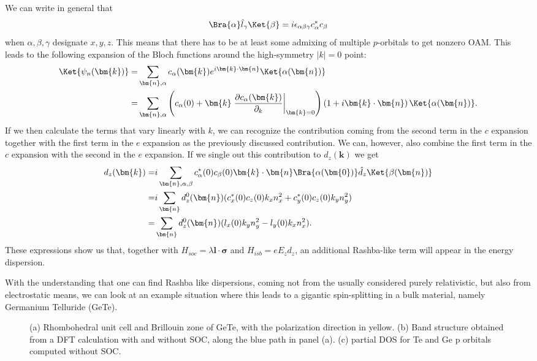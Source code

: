 We can write in general that
\begin{equation}
	\Bra{\alpha} \hat{l}_{\gamma} \Ket{\beta} = i \epsilon_{\alpha \beta \gamma} c^*_\alpha c_\beta
\end{equation}
when $\alpha,\beta,\gamma$ designate $x,y,z$. This means that there has to be at least some admixing of multiple $p$-orbitals to get nonzero OAM. This leads to the following expansion of the Bloch functions around the high-symmetry $|k|=0$ point:
\begin{align}
	\Ket{\psi_n(\bm{k})} =& \sum_{\bm{n},\alpha} c_\alpha(\bm{k}) e^{i \bm{k}\cdot\bm{n}}\Ket{\alpha(\bm{n})}\\
	=& \sum_{\bm{n},\alpha} \left(c_\alpha(0) + \bm{k}\left.\frac{\partial c_\alpha(\bm{k})}{\partial_k}\right\rvert_{\bm{k}=0} \right)\left(1 + i\bm{k}\cdot\bm{n}\right)\Ket{\alpha(\bm{n})} .
\end{align}
If we then calculate the terms that vary linearly with $k$, we can recognize the contribution coming from the second term in the $c$ expansion together with the first term in the $e$ expansion as the previously discussed contribution. We can, however, also combine the first term in the $c$ expansion with the second in the $e$ expansion. If we single out this contribution to $d_z(\bm{k})$ we get
\begin{align}
	\label{eq:d_z_from_OAM}
	d_z(\bm{k}) =&  i\sum_{\bm{n},\alpha,\beta} c_\alpha^*(0)c_\beta(0)\bm{k}\cdot\bm{n}\Bra{\alpha(\bm{0})} \hat{d}_z \Ket{\beta(\bm{n})}\\
	=&i\sum_{\bm{n}} d^0_z(\bm{n}) (c^*_x(0)c_z(0)k_x n_x^2 + c^*_y(0)c_z(0) k_y n_y^2) \\
	=&\sum_{\bm{n}} d^0_z(\bm{n}) (l_x(0)k_y n_y^2-l_y(0) k_x n_x^2).
\end{align}
These expressions show us that, together with $H_{soc} = \lambda \bm{l}\cdot\bm{\sigma}$ and $H_{isb} = e E_z d_z$, an additional Rashba-like term will appear in the energy dispersion.

With the understanding that one can find Rashba like dispersions, coming not from the usually considered purely relativistic, but also from electrostatic means, we can look at an example situation where this leads to a gigantic spin-splitting in a bulk material, namely Germanium Telluride (GeTe).

\begin{figure}[b]
{}
\caption{\label{fig:eigvalsdos}(a) Rhombohedral unit cell and Brillouin zone of GeTe, with the polarization direction in yellow. (b) Band structure obtained from a DFT calculation with and without SOC, along the blue path in panel (a). (c) partial DOS for Te and Ge p orbitals computed without SOC.}
\end{figure}
